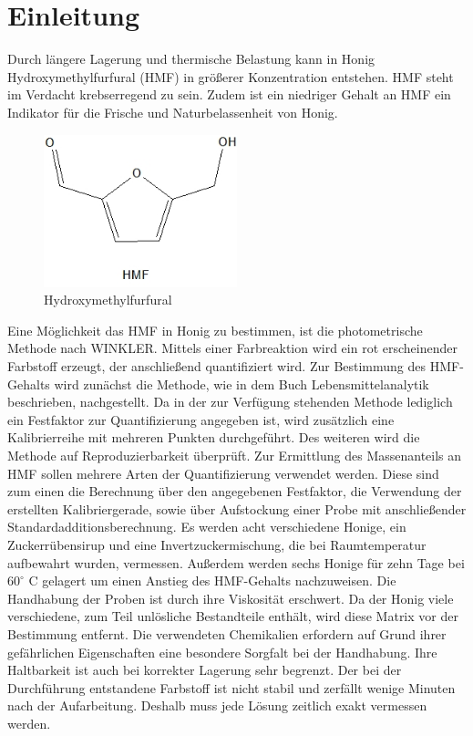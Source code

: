 \chapter{Einleitung} 

Durch längere Lagerung und thermische Belastung kann in Honig Hydroxymethylfurfural (HMF) in größerer Konzentration entstehen. HMF steht im Verdacht krebserregend zu sein. Zudem ist ein niedriger Gehalt an HMF ein Indikator für die Frische und Naturbelassenheit von Honig.
\begin{figure}[htbp]
	\centering
		\includegraphics[width=0.5\textwidth]{../Bilder/HMF.jpg}
	\caption{Hydroxymethylfurfural}
	\label{fig:HMF}
\end{figure}
\newline
Eine Möglichkeit das HMF in Honig zu bestimmen, ist die photometrische Methode nach WINKLER. Mittels einer Farbreaktion wird ein rot erscheinender Farbstoff erzeugt, der anschließend quantifiziert wird. Zur  Bestimmung des HMF-Gehalts wird zunächst die Methode, wie in dem Buch Lebensmittelanalytik~\cite{Lebensmittelanalytik} beschrieben, nachgestellt. Da in der zur Verfügung stehenden Methode lediglich ein Festfaktor zur Quantifizierung angegeben ist, wird zusätzlich eine Kalibrierreihe mit mehreren Punkten durchgeführt. Des weiteren wird die Methode auf Reproduzierbarkeit überprüft. Zur Ermittlung des Massenanteils an HMF sollen mehrere Arten der Quantifizierung verwendet werden. Diese sind zum einen die Berechnung über den angegebenen Festfaktor, die Verwendung der erstellten Kalibriergerade, sowie über Aufstockung einer Probe mit anschließender Standardadditionsberechnung. Es werden acht verschiedene Honige, ein Zuckerrübensirup und eine Invertzuckermischung, die bei Raumtemperatur aufbewahrt wurden, vermessen. Außerdem werden sechs Honige für zehn Tage bei $60^\circ$ C gelagert um einen Anstieg des HMF-Gehalts nachzuweisen. Die Handhabung der Proben ist durch ihre Viskosität erschwert. Da der Honig viele verschiedene, zum Teil unlösliche Bestandteile enthält, wird diese Matrix vor der Bestimmung entfernt. Die verwendeten Chemikalien erfordern auf Grund ihrer gefährlichen Eigenschaften eine besondere Sorgfalt bei der Handhabung. Ihre Haltbarkeit ist auch bei korrekter Lagerung sehr begrenzt. Der bei der Durchführung entstandene Farbstoff ist nicht stabil und zerfällt wenige Minuten nach der Aufarbeitung. Deshalb muss jede Lösung zeitlich exakt vermessen werden.~\cite{Winkler}